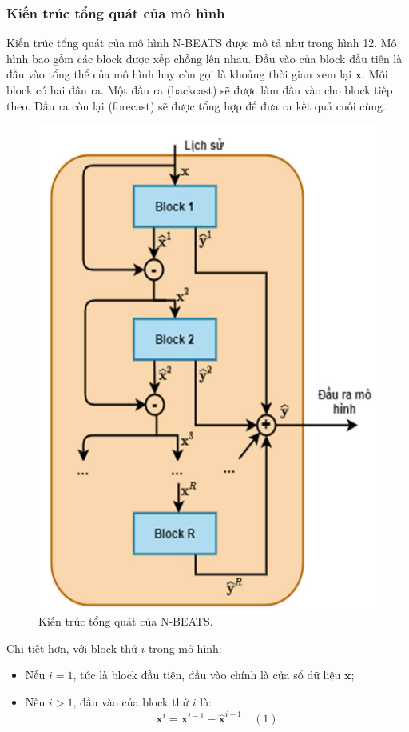 \documentclass[conference]{IEEEtran}
\begin{document}
\subsubsection{Kiến trúc tổng quát của mô hình}
Kiến trúc tổng quát của mô hình N-BEATS được mô tả như trong hình 12. Mô hình bao gồm các block được xếp chồng lên nhau. Đầu vào của block đầu tiên là đầu vào tổng thể của mô hình hay còn gọi là khoảng thời gian xem lại $\mathbf{x}$. Mỗi block có hai đầu ra. Một đầu ra (backcast) sẽ được làm đầu vào cho block tiếp theo. Đầu ra còn lại (forecast) sẽ được tổng hợp để đưa ra kết quả cuối cùng.
\begin{figure}[H]
    \centering
    \begin{minipage}{0.23\textwidth}
        \centering
        \includegraphics[width=1\textwidth]{bibliography/figure/N-BEATS/1.png}
        \caption{Kiến trúc tổng quát của N-BEATS.}
        \label{fig:N-BEATS}
    \end{minipage}
\end{figure}
Chi tiết hơn, với block thứ $i$ trong mô hình:
\begin{itemize}
    \item Nếu $i = 1$, tức là block đầu tiên, đầu vào chính là cửa sổ dữ liệu $\mathbf{x}$;
    \item Nếu $i > 1$, đầu vào của block thứ $i$ là:
          \[
              \mathbf{x}^i = \mathbf{x}^{i-1} - \hat{\mathbf{x}}^{i-1} \quad (1)
          \]
\end{itemize}
\end{document}
